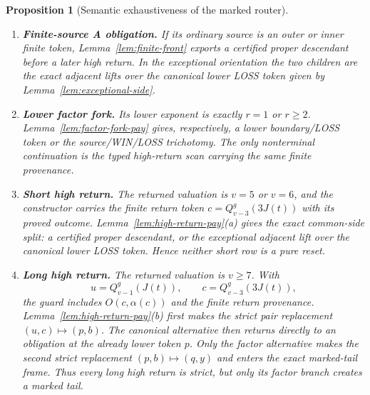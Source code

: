 \documentclass[11pt]{article}
\newtheorem{proposition}[theorem]{Proposition}
\begin{document}
\begin{proposition}[Semantic exhaustiveness of the marked router]
\begin{enumerate}[label=\textnormal{(S\arabic*)},leftmargin=*]
\item \textbf{Finite-source A obligation.}  If its ordinary source is an
outer or inner finite token, Lemma~\ref{lem:finite-front} exports a certified
proper descendant before a later high return.  In the exceptional orientation
the two children are the exact adjacent lifts over the canonical lower LOSS
token given by Lemma~\ref{lem:exceptional-side}.

\item \textbf{Lower factor fork.}  Its lower exponent is exactly $r=1$ or
$r\ge2$.  Lemma~\ref{lem:factor-fork-pay} gives, respectively, a lower
boundary/LOSS token or the source/WIN/LOSS trichotomy.  The only nonterminal
continuation is the typed high-return scan carrying the same finite
provenance.

\item \textbf{Short high return.}  The returned valuation is $v=5$ or
$v=6$, and the constructor carries the finite return token
$c=Q_{v-3}^g(3J(t))$ with its proved outcome.  Lemma~\ref{lem:high-return-pay}(a)
gives the exact common-side split: a certified proper descendant, or the
exceptional adjacent lift over the canonical lower LOSS token.  Hence neither
short row is a pure reset.

\item \textbf{Long high return.}  The returned valuation is $v\ge7$.  With
\[
 u=Q_{v-1}^g(J(t)),\qquad c=Q_{v-3}^g(3J(t)),
\]
the guard includes $O(c,\alpha(c))$ and the finite return provenance.
Lemma~\ref{lem:high-return-pay}(b) first makes the strict pair replacement
$(u,c)\mapsto(p,b)$.  The canonical alternative then returns directly to an
obligation at the already lower token $p$.  Only the factor alternative makes
the second strict replacement $(p,b)\mapsto(q,y)$ and enters the exact
marked-tail frame. Thus every long high return is strict, but only its factor
branch creates a marked tail.


\end{enumerate}
\end{proposition}
\end{document}
